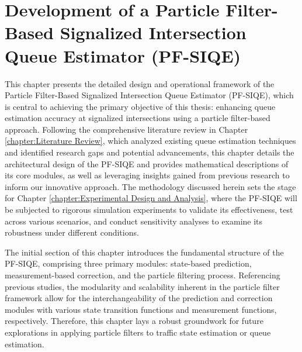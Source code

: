 \chapter{Development of a Particle Filter-Based Signalized Intersection Queue Estimator (PF-SIQE)}
\label{chapter: Development of a Particle Filter-Based Signalized Intersection Queue Estimator (PF-SIQE)}
This chapter presents the detailed design and operational framework of the Particle Filter-Based Signalized Intersection Queue Estimator (PF-SIQE), which is central to achieving the primary objective of this thesis: enhancing queue estimation accuracy at signalized intersections using a particle filter-based approach. Following the comprehensive literature review in Chapter \ref{chapter:Literature Review}, which analyzed existing queue estimation techniques and identified research gaps and potential advancements, this chapter details the architectural design of the PF-SIQE and provides mathematical descriptions of its core modules, as well as leveraging insights gained from previous research to inform our innovative approach. The methodology discussed herein sets the stage for Chapter \ref{chapter:Experimental Design and Analysis}, where the PF-SIQE will be subjected to rigorous simulation experiments to validate its effectiveness, test across various scenarios, and conduct sensitivity analyses to examine its robustness under different conditions. 

The initial section of this chapter introduces the fundamental structure of the PF-SIQE, comprising three primary modules: state-based prediction, measurement-based correction, and the particle filtering process. Referencing previous studies, the modularity and scalability inherent in the particle filter framework allow for the interchangeability of the prediction and correction modules with various state transition functions and measurement functions, respectively. Therefore, this chapter lays a robust groundwork for future explorations in applying particle filters to traffic state estimation or queue estimation.

